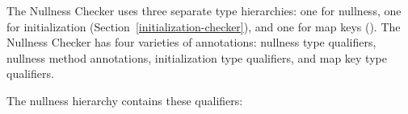 \iffalse %
The Nullness Checker uses four separate type hierarchies:  one for nullness,
one for initialization (Section~\ref{initialization-checker}),
one for map keys (\chapterpageref{map-key-checker}),
and one for path shapes (\chapterpageref{path-shape-checker}).
The Nullness Checker has five varieties of annotations:  nullness
type qualifiers, nullness method annotations, initialization type qualifiers,
map key type qualifiers, and path shape type qualifiers.
\else
The Nullness Checker uses three separate type hierarchies:  one for nullness,
one for initialization (Section~\ref{initialization-checker}),
and one for map keys ().
The Nullness Checker has four varieties of annotations:  nullness
type qualifiers, nullness method annotations, initialization type qualifiers, and
map key type
qualifiers.
\fi


The nullness hierarchy contains these qualifiers:

